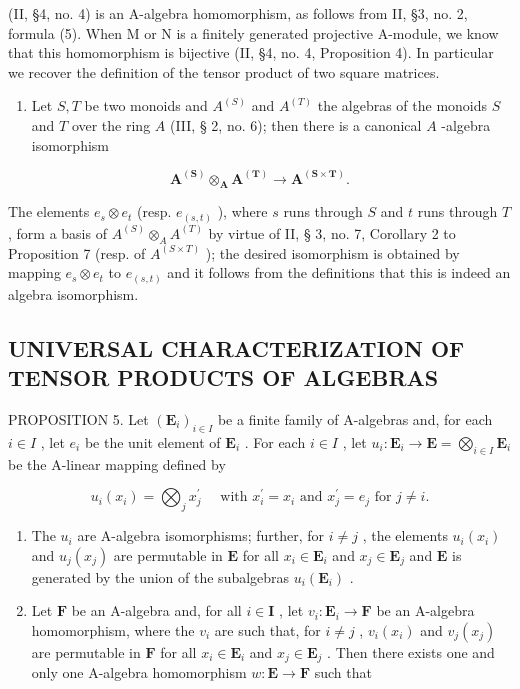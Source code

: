 (II, §4, no. 4) is an A-algebra homomorphism, as follows from II, §3, no. 2, formula (5). When M or N is a finitely generated projective A-module, we know that this homomorphism is bijective (II, §4, no. 4, Proposition 4). In particular we recover the definition of the tensor product of two square matrices.

\begin{enumerate}
\def\labelenumi{(\arabic{enumi})}
\setcounter{enumi}{1}
\tightlist
\item
  Let \(S, T\) be two monoids and \(A^{(S)}\) and \(A^{(T)}\) the algebras of the monoids \(S\) and \(T\) over the ring \(A\) (III, § 2, no. 6); then there is a canonical \(A\) -algebra isomorphism
\end{enumerate}

\[
\mathbf {A} ^ {(\mathbf {S})} \otimes_ {\mathbf {A}} \mathbf {A} ^ {(\mathbf {T})} \rightarrow \mathbf {A} ^ {(\mathbf {S} \times \mathbf {T})}.\tag{3}
\]

The elements \(e_s \otimes e_t\) (resp. \(e_{(s,t)}\) ), where \(s\) runs through \(S\) and \(t\) runs through \(T\) , form a basis of \(A^{(S)} \otimes_A A^{(T)}\) by virtue of II, § 3, no. 7, Corollary 2 to Proposition 7 (resp. of \(A^{(S \times T)}\) ); the desired isomorphism is obtained by mapping \(e_s \otimes e_t\) to \(e_{(s,t)}\) and it follows from the definitions that this is indeed an algebra isomorphism.

\subsection{UNIVERSAL CHARACTERIZATION OF TENSOR PRODUCTS OF ALGEBRAS}

PROPOSITION 5. Let \((\mathbf{E}_i)_{i\in I}\) be a finite family of A-algebras and, for each \(i\in I\) , let \(e_i\) be the unit element of \(\mathbf{E}_i\) . For each \(i\in I\) , let \(u_i: \mathbf{E}_i \to \mathbf{E} = \bigotimes_{i\in I} \mathbf{E}_i\) be the A-linear mapping defined by

\[
u _ {i} (x _ {i}) = \bigotimes_ {j} x _ {j} ^ {\prime} \quad \text { with } x _ {i} ^ {\prime} = x _ {i} \text { and } x _ {j} ^ {\prime} = e _ {j} \text { for } j \neq i.
\]

\begin{enumerate}
\def\labelenumi{(\roman{enumi})}
\item
  The \(u_{i}\) are A-algebra isomorphisms; further, for \(i \neq j\) , the elements \(u_{i}(x_{i})\) and \(u_{j}(x_{j})\) are permutable in \(\mathbf{E}\) for all \(x_{i} \in \mathbf{E}_{i}\) and \(x_{j} \in \mathbf{E}_{j}\) and \(\mathbf{E}\) is generated by the union of the subalgebras \(u_{i}(\mathbf{E}_{i})\) .
\item
  Let \(\mathbf{F}\) be an A-algebra and, for all \(i \in \mathbf{I}\) , let \(v_i: \mathbf{E}_i \to \mathbf{F}\) be an A-algebra homomorphism, where the \(v_i\) are such that, for \(i \neq j\) , \(v_i(x_i)\) and \(v_j(x_j)\) are permutable in \(\mathbf{F}\) for all \(x_i \in \mathbf{E}_i\) and \(x_j \in \mathbf{E}_j\) . Then there exists one and only one A-algebra homomorphism \(w: \mathbf{E} \to \mathbf{F}\) such that
\end{enumerate}

